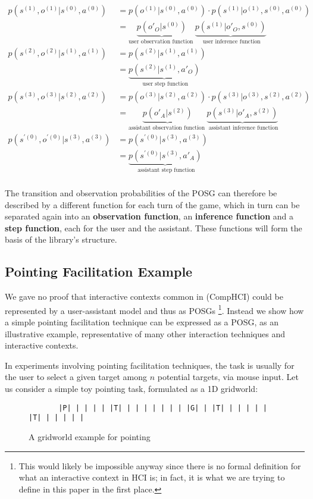 \documentclass[12pt,a4paper]{article}
\begin{document}
\[\begin{split}p(s^{(1)}, o^{(1)} | s^{(0)}, a^{(0)}) & = p(o^{(1)} | s^{(0)}, a^{(0)}) \cdot{} p(s^{(1)}| o^{(1)}, s^{(0)}, a^{(0)}) \\ &= \underbrace{p(o'_O | s^{(0)})}_\text{user observation function } \underbrace{p(s^{(1)}| o'_O, s^{(0)})}_\text{ user inference function} \\ p(s^{(2)}, o^{(2)} | s^{(1)}, a^{(1)}) & = p(s^{(2)}| s^{(1)}, a^{(1)}) \\ &= \underbrace{p(s^{(2)}| s^{(1)}, a'_O)}_\text{ user step function} \\ p(s^{(3)}, o^{(3)} | s^{(2)}, a^{(2)}) & = p(o^{(3)} | s^{(2)}, a^{(2)}) \cdot{} p(s^{(3)}| o^{(3)}, s^{(2)}, a^{(2)}) \\ &= \underbrace{p(o'_A | s^{(2)})}_\text{assistant observation function } \underbrace{p(s^{(3)}| o'_A, s^{(2)})}_\text{ assistant inference function} \\ p(s^{'(0)}, o^{'(0)} | s^{(3)}, a^{(3)}) & = p(s^{'(0)}| s^{(3)}, a^{(3)}) \\ &= \underbrace{p(s^{'(0)}| s^{(3)}, a'_A)}_\text{ assistant step function} \\\end{split}\]

The transition and observation probabilities of the POSG can therefore be described by a different function for each turn of the game, which in turn can be separated again into an \textbf{observation function}, an \textbf{inference function} and a \textbf{step function}, each for the user and the assistant. These functions will form the basis of the library's structure.

   

\subsection{Pointing Facilitation Example}
We gave no proof that interactive contexts common in (CompHCI) could be represented by a user-assistant model and thus as POSGs
\footnote{This would likely be impossible anyway since there is no formal definition for what an interactive context in HCI is; in fact, it is what we are trying to define in this paper in the first place.}. Instead we show how a simple pointing facilitation technique can be expressed as a POSG, as an illustrative example, representative of many other interaction techniques and interactive contexts.  


In experiments involving pointing facilitation techniques, the task is usually for the user to select a given target among $n$ potential targets, via mouse input.
Let us consider a simple toy pointing task, formulated as a 1D gridworld:
\begin{figure}[H]
\begin{verbatim}
       |P| | | | | |T| | | | | | | | |G| | |T| | | | | | |T| | | | | |
\end{verbatim}
\caption{A gridworld example for pointing}
\end{figure}
\end{document}
